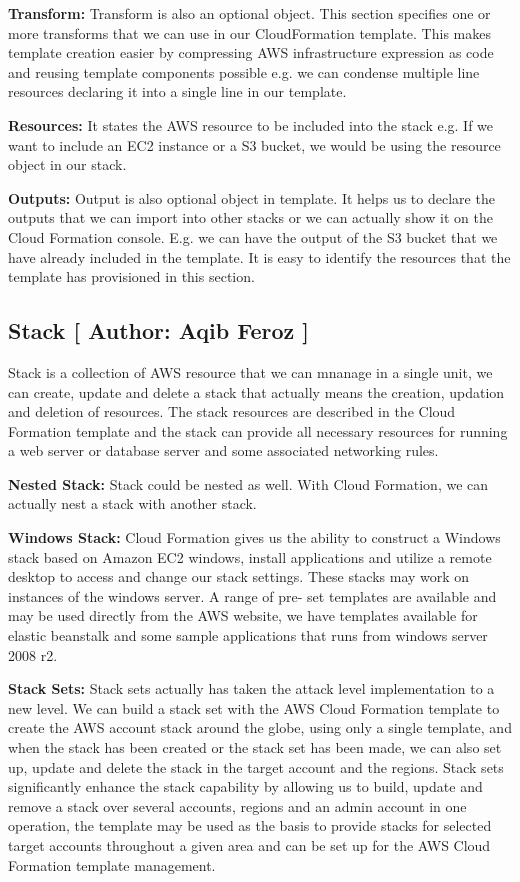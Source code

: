 \textbf{Transform:} Transform is also an optional object. This section specifies one or more transforms that we can use in our CloudFormation template. This makes template creation easier by compressing AWS infrastructure expression as code and reusing template components possible
e.g. we can condense multiple line resources declaring it into a single line in our template.


\textbf{Resources:} It states the AWS resource to be included into the stack e.g. If we want to include an EC2 instance or a S3 bucket, we would be using the resource object in our stack.

\textbf{Outputs:} Output is also optional object in template. It helps us to declare the outputs that we can import into other stacks or we can actually show it on the Cloud Formation console. E.g. we can have the output of the S3 bucket that we have already included in the template. It is easy to identify the resources that the template has provisioned in this section.

\subsection{Stack [ Author: Aqib Feroz ]}
Stack is a collection of AWS resource that we can mnanage in a single unit, we can create, update and delete a stack that actually means the creation, updation and deletion of resources. The stack resources are described in the Cloud Formation template and the stack can provide all necessary resources for running a web server or database server and some associated networking rules.

\textbf{Nested Stack:}
Stack could be nested as well. With Cloud Formation, we can actually nest a stack with another stack. 

\textbf{Windows Stack:}
Cloud Formation gives us the ability to construct a Windows stack based on Amazon EC2 windows, install applications and utilize a remote desktop to access and change our stack settings. These stacks may work on instances of the windows server. A range of pre- set templates are available and may be used directly from the AWS website, we have templates available for elastic beanstalk and some sample applications that runs from windows server 2008 r2.

\textbf{Stack Sets:}
Stack sets actually has taken the attack level implementation to a new level. We can build a stack set with the AWS Cloud Formation template to create the AWS account stack around the globe, using only a single template, and when the stack has been created or the stack set has been made, we can also set up, update and delete the stack in the target account and the regions. Stack sets significantly enhance the stack capability by allowing us to build, update and remove a stack over several accounts, regions and an admin account in one operation, the template may be used as the basis to provide stacks for selected target accounts throughout a given area and can be set up for the AWS Cloud Formation template management.
